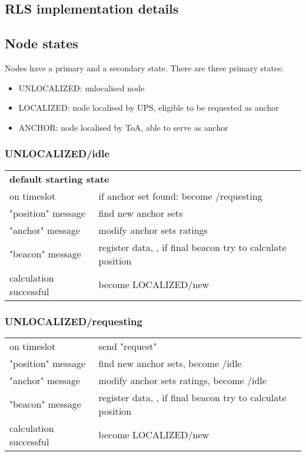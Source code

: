 \documentclass[12pt,a4paper,fleqn]{report}
\begin{document}
\begin{appendices}
\chapter{RLS implementation details}
\label{appendix:rls}

\section*{Node states}

Nodes have a primary and a secondary state. There are three primary states:
\begin{itemize}
	\itemsep0em
	\item UNLOCALIZED: unlocalised node
	\item LOCALIZED: node localised by UPS, eligible to be requested as anchor
	\item ANCHOR: node localised by ToA, able to serve as anchor
\end{itemize}

\subsection*{UNLOCALIZED/idle}

\begin{tabular}{p{5cm}p{10cm}}
	\multicolumn{2}{l}{\textbf{default starting state}} \\
	on timeslot			& if anchor set found: become /requesting \\
	"position" message	& find new anchor sets \\
	"anchor" message	& modify anchor sets ratings \\
	"beacon" message	& register data, , if final beacon try to calculate position \\
	calculation successful	& become LOCALIZED/new \\
\end{tabular}

\subsection*{UNLOCALIZED/requesting}

\begin{tabular}{p{5cm}p{10cm}}
	on timeslot			& send "request" \\
	"position" message	& find new anchor sets, become /idle \\
	"anchor" message	& modify anchor sets ratings, become /idle \\
	"beacon" message	& register data, , if final beacon try to calculate position \\
	calculation successful	& become LOCALIZED/new \\
\end{tabular}


\end{appendices}
\end{document}

